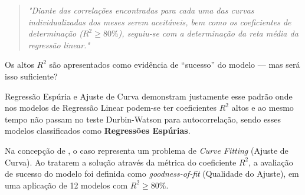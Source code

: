\documentclass{beamer}
\begin{document}
		\begin{frame}
		
		\begin{quote}
			\textit{"Diante das correlações encontradas para cada uma das curvas individualizadas dos meses serem aceitáveis, bem como os coeficientes de determinação ($R^{2} \ge 80\%$), seguiu-se com a determinação da reta média da regressão linear."}
			\hfill \parencite{santos2023porto}
		\end{quote}
		
		\vspace{5mm}
		
		Os altos $R^2$ são apresentados como evidência de ``sucesso''
		do modelo — mas será isso suficiente?
		
	\end{frame}
	
	\begin{frame}{Regressão Espúria e Ajuste de Curva}                                                                                                                 
		\textcite{granger1974spurious} demonstram justamente esse padrão onde            nos modelos de Regressão Linear podem-se ter coeficientes $R^{2}$ altos e ao mesmo tempo não passam no teste Durbin-Watson para autocorrelação, sendo esses modelos classificados como \textbf{Regressões Espúrias}.                                                               
		
		\vspace{1em}                                                                                                                                 
		Na concepção de \textcite{spanos2007curve}, o caso \textcite{santos2023porto} representa um problema de \textit{Curve Fitting} (Ajuste de Curva). Ao tratarem a solução através da métrica do coeficiente $R^{2}$, a avaliação de sucesso do modelo foi definida como \textit{goodness-of-fit} (Qualidade do Ajuste), em uma aplicação de 12 modelos com $R^{2} \geq 80\%$.
		
	\end{frame}
	
\end{document}
